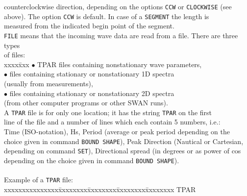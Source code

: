 \documentclass[12pt]{book}
\begin{document}
\begin{tabbing}
                        counterclockwise direction, depending on the options {\tt CCW} or {\tt CLOCKWISE} (see\\
                        above). The option {\tt CCW} is default. In case of a {\tt SEGMENT} the length is\\
                        measured from the indicated begin point of the segment.\-\\
{\tt FILE}           \> means that the incoming wave data are read from a file. There are three types\+\\
                        of files:\\
                        \pushtabs
                        xxxx\=xxx \kill
                        {$\bullet$} \> TPAR files containing nonstationary wave parameters,\\
                        {$\bullet$} \> files containing stationary or nonstationary 1D spectra\+\\
                                       (usually from measurements),\-\\
                        {$\bullet$} \> files containing stationary or nonstationary 2D spectra\+\\
                                       (from other computer programs or other SWAN runs).\-\\
                        \poptabs
                        A {\tt TPAR} file is for only one location; it has the string {\tt TPAR} on the first\\
                        line of the file and a number of lines which each contain 5 numbers, i.e.:\\
                        Time (ISO-notation), Hs, Period (average or peak period depending on the\\
                        choice given in command {\tt BOUND SHAPE}), Peak Direction (Nautical or Cartesian,\\
                        depending on command {\tt SET}), Directional spread (in degrees or as power of cos\\
                        depending on the choice given in command {\tt BOUND SHAPE}).\\
                        \\
                        Example of a {\tt TPAR} file:\\
                        \pushtabs
                           xxxxxxxxxxxxxxx\=xxxxxxxx\=xxxxxxxx\=xxxxxxxx\=xxxxxxxx \kill
                           TPAR\\

\end{tabbing}
\end{document}
